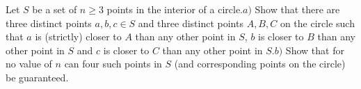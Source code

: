 Let $S$ be a set of $n\ge 3$ points in the interior of a circle.$a)$ Show that there are three distinct points $a,b,c\in S$ and three distinct points $A,B,C$ on the circle such that $a$ is (strictly) closer to $A$ than any other point in $S$,  $b$ is closer to $B$ than any other point in $S$ and $c$ is closer to $C$ than any other point in $S$.$b)$ Show that for no value of $n$ can four such points in $S$ (and corresponding points on the circle) be guaranteed.